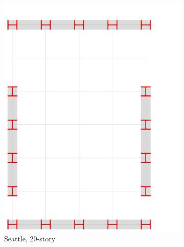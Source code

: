 \documentclass[onecolumn, fleqn]{article}
\begin{document}
\begin{figure}[H]
\begin{subfigure}[b]{0.24\linewidth}
		\centering \includegraphics[page=2,trim=0mm 0mm 90mm 100mm,clip,scale=0.2]{moment_frames.pdf}
		\caption{Seattle, 20-story}
	\end{subfigure}
	\begin{subfigure}[b]{0.24\linewidth}

\end{subfigure}
\end{figure}
\end{document}
